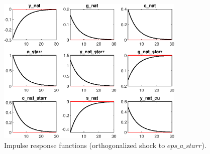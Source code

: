  
\begin{figure}[H]
\centering 
\includegraphics[width=0.80\textwidth]{Model_draft_4_Natural/graphs/Model_draft_4_Natural_IRF_eps_a_starr}
\caption{Impulse response functions (orthogonalized shock to $eps\_a\_starr$).}
\label{Fig:IRF:eps_a_starr}
\end{figure}
 
 

